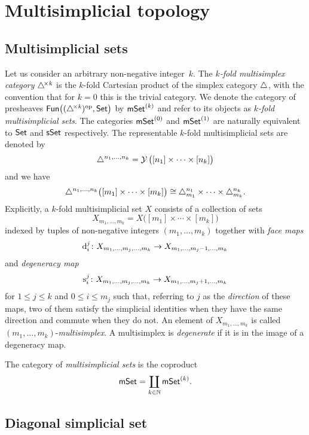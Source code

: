 
\section{Multisimplicial topology}


\subsection{Multisimplicial sets}

Let us consider an arbitrary non-negative integer~$k$.
The \textit{$k$-fold multisimplex category} $\triangle^{\!\times\mathit{k}}$ is the $k$-fold Cartesian product of the simplex category $\triangle$, with the convention that for $k = 0$ this is the trivial category.
We denote the category of presheaves $\mathsf{Fun} \big( (\triangle^{\!\times\mathit{k}})^{\mathrm{op}}, \mathsf{Set} \big)$ by $\mathsf{mSet}^{(k)}$ and refer to its objects as \textit{$k$-fold multisimplicial sets}.
The categories $\mathsf{mSet}^{(0)}$ and $\mathsf{mSet}^{(1)}$ are naturally equivalent to $\mathsf{Set}$ and $\mathsf{sSet}$ respectively.
The representable $k$-fold multisimplicial sets are denoted by
\[
\triangle^{n_1, \dots, n_k} =
\operatorname{\mathcal{Y}} \big( [n_1] \times \cdots \times [n_k] \big)
\]
and we have
\[
\triangle^{n_1, \dots, n_k} \big( [m_1] \times \cdots \times [m_k] \big) \cong
\triangle^{n_1}_{m_1} \times \dots \times \triangle^{n_k}_{m_k}.
\]
Explicitly, a $k$-fold multisimplicial set $X$ consists of a collection of sets
\[
X_{m_1, \dots, m_k} =
X \big( [m_1] \times \cdots \times [m_k] \big)
\]
indexed by tuples of non-negative integers $(m_1, \dots, m_k)$ together with \textit{face maps}
\[
\operatorname{d}_i^j \colon
X_{m_1, \dots, m_j, \dots, m_k} \to
X_{m_1, \dots, m_j-1, \dots, m_k}
\]
and \textit{degeneracy map}
\[
\operatorname{s}^j_i \colon X_{m_1, \dots, m_j, \dots, m_k} \to X_{m_1, \dots, m_j+1, \dots, m_k}
\]
for $1 \leq j \leq k$ and $0 \leq i \leq m_j$ such that, referring to $j$ as the \textit{direction} of these maps, two of them satisfy the simplicial identities when they have the same direction and commute when they do not.
An element of $X_{m_1, \dots, m_k}$ is called
$(m_1, \dots, m_k)$-\textit{multisimplex}.
A multisimplex is \textit{degenerate} if it is in the image of a degeneracy map.

The category of \textit{multisimplicial sets} is the coproduct
\[
\mathsf{mSet} = \coprod_{k \in \mathbb{N}} \mathsf{mSet}^{(k)}.
\]

\subsection{Diagonal simplicial set} \label{ss:diagonal simplicial set}

